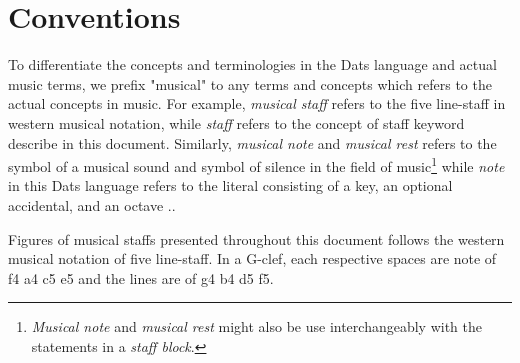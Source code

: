 \section{Conventions}

\np To differentiate the concepts and terminologies in the Dats language and
actual music terms, we prefix "musical" to any terms and concepts which
refers to the actual concepts in music. For example, \textit{musical staff} refers
to the five line-staff in western musical notation, while \textit{staff} refers to
the concept of staff keyword describe in this document. Similarly,
\textit{musical note} and \textit{musical rest} refers to the symbol of a musical
sound and symbol of silence in the field of music\footnote{\textit{Musical note} and
\textit{musical rest} might also be use interchangeably with the statements in a \textit{staff block}.}
while \textit{note} in this Dats language refers to the literal consisting
of a key, an optional accidental, and an octave \protect{}..
 
\np Figures of musical staffs presented throughout this document follows the
western musical notation of five line-staff. In a G-clef, each respective
spaces are note of f4 a4 c5 e5 and the lines are of g4 b4 d5 f5.



